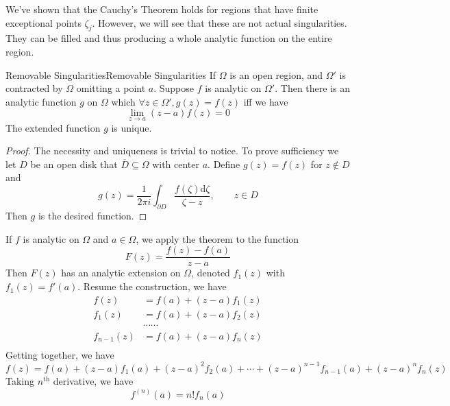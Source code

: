 \documentclass[../main.tex]{subfiles}
\begin{document}
We've shown that the Cauchy's Theorem holds for regions that have finite exceptional points $\zeta_j$. However, we will see that these are not actual singularities. They can be filled and thus producing a whole analytic function on the entire region.

\begin{theorem}{Removable Singularities}{Removable Singularities}
	If $\Omega$ is an open region, and $\Omega'$ is contracted by $\Omega$ omitting a point $a$. Suppose $f$ is analytic on $\Omega'$. Then there is an analytic function $g$ on $\Omega$ which $\forall z\in \Omega', g(z) = f(z)$ iff we have
	\begin{equation*}
	\lim_{z \to a} (z-a)f(z) = 0
	\end{equation*}
	The extended function $g$ is unique.
\end{theorem}
\begin{proof}
The necessity and uniqueness is trivial to notice. To prove sufficiency we let $D$ be an open disk that $\overline{D} \subseteq \Omega$ with center $a$. Define $g(z) = f(z)$ for $z\notin D$ and
\begin{equation*}
g(z) = \frac{1}{2 \pi i}\int_{\partial D} \frac{f(\zeta) \mathrm{d} \zeta}{\zeta-z}, \qquad z\in D
\end{equation*}
Then $g$ is the desired function.
\end{proof}

If $f$ is analytic on $\Omega$ and $a\in \Omega$, we apply the theorem to the function
\begin{equation*}
	F(z) = \frac{f(z) - f(a)}{z-a}
\end{equation*}
Then $F(z)$ has an analytic extension on $\Omega$, denoted $f_1(z)$ with $f_1(z) = f'(a)$. Resume the construction, we have
\begin{equation}
\begin{aligned}
	f(z) &= f(a) + (z-a) f_1(z)\\
	f_1(z) &= f(a) + (z-a) f_2(z)\\
	       &\cdots \cdots \\
	f_{n-1}(z) &= f(a) + (z-a) f_n(z)\\
\end{aligned}
\end{equation}
Getting together, we have
\begin{equation*}
f(z) = f(a) + (z-a)f_1(a) + (z-a)^2f_2(a) + \cdots + (z-a)^{n-1}f_{n-1}(a) + (z-a)^n f_n(z)
\end{equation*}
Taking $n^{\text{th}}$ derivative, we have
\begin{equation*}
f^{(n)}(a) = n!f_n(a)
\end{equation*}
\end{document}
